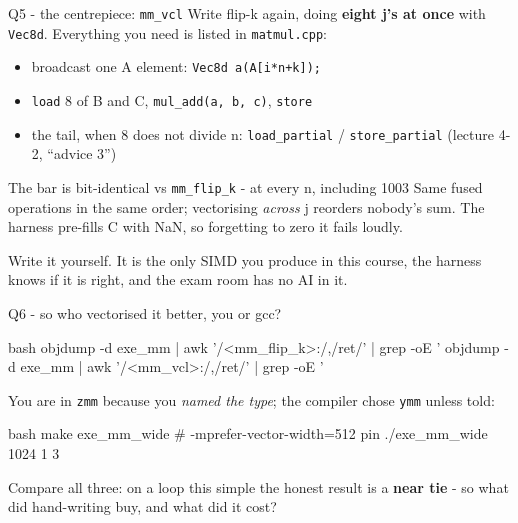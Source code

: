 \documentclass[aspectratio=169]{beamer}
\newcommand{\cplx}[1]{{\footnotesize\color{cookieMuted}#1}}
\begin{document}
\begin{frame}{Q5 - the centrepiece: \texttt{mm\_vcl}}
  Write flip-k again, doing \textbf{eight j's at once} with \texttt{Vec8d}.
  Everything you need is listed in \texttt{matmul.cpp}:
  \medskip
  \begin{itemize}\setlength\itemsep{5pt}
    \item broadcast one A element: \texttt{Vec8d a(A[i*n+k]);}
    \item \texttt{load} 8 of B and C, \texttt{mul\_add(a, b, c)}, \texttt{store}
    \item the tail, when 8 does not divide n:
      \texttt{load\_partial} / \texttt{store\_partial}
      \cplx{(lecture 4-2, ``advice 3'')}
  \end{itemize}
  \bigskip
  \begin{block}{The bar is bit-identical vs \texttt{mm\_flip\_k} - at every n, including 1003}
    Same fused operations in the same order; vectorising \emph{across} j
    reorders nobody's sum. The harness pre-fills C with NaN, so forgetting to
    zero it fails loudly.
  \end{block}
  \medskip
  \cplx{Write it yourself. It is the only SIMD you produce in this course, the
  harness knows if it is right, and the exam room has no AI in it.}
\end{frame}

\begin{frame}[fragile]{Q6 - so who vectorised it better, you or gcc?}
  \begin{cookiecode}[title={look at the registers each of you used}]{bash}
objdump -d exe_mm | awk '/<mm_flip_k>:/,/ret/' | grep -oE '%
objdump -d exe_mm | awk '/<mm_vcl>:/,/ret/'    | grep -oE '%
  \end{cookiecode}
  \pause
  You are in \texttt{zmm} because you \emph{named the type}; the compiler
  chose \texttt{ymm} unless told:
  \begin{cookiecode}[title={the lecture's extra flag}]{bash}
make exe_mm_wide           # -mprefer-vector-width=512
pin ./exe_mm_wide 1024 1 3
  \end{cookiecode}
  Compare all three: on a loop this simple the honest result is a
  \textbf{near tie} - so what did hand-writing buy, and what did it cost?
\end{frame}
\end{document}
